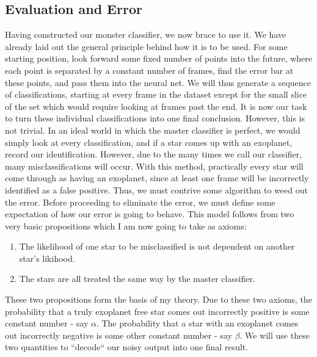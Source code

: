 \documentclass[twocolumn, 12pt]{article}
\begin{document}
\subsection{Evaluation and Error}
\indent \indent Having constructed our monster classifier, we now brace to use it. We have already laid out the general principle behind how it is to be used. For some starting position, look forward some fixed number of points into the future, where each point is separated by a constant number of frames, find the error bar at these points, and pass them into the neural net. We will thus generate a sequence of classifications, starting at every frame in the dataset except for the small slice of the set which would require looking at frames past the end.
\newline
\indent It is now our task to turn these individual classifications into one final conclusion. However, this is not trivial. In an ideal world in which the master classifier is perfect, we would simply look at every classification, and if a star comes up with an exoplanet, record our identification. However, due to the many times we call our classifier, many misclassifications will occur. With this method, practically every star will come through as having an exoplanet, since at least one frame will be incorrectly identified as a false positive. Thus, we must contrive some algorithm to weed out the error.
\newline
\indent Before proceeding to eliminate the error, we must define some expectation of how our error is going to behave. This model follows from two very basic propositions which I am now going to take as axioms:
\begin{enumerate}
\item The likelihood of one star to be misclassified is not dependent on another star's likihood.
\item The stars are all treated the same way by the master classifier.
\end{enumerate}
These two propositions form the basis of my theory. Due to these two axioms, the probability that a truly exoplanet free star comes out incorrectly positive is some constant number - say $ \alpha $. The probability that a star with an exoplanet comes out incorrectly negative is some other constant number - say $ \beta $. We will use these two quantities to ``decode`` our noisy output into one final result.
\end{document}
